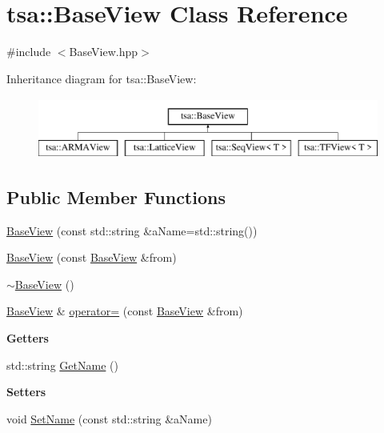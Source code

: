 \hypertarget{classtsa_1_1_base_view}{}\section{tsa\+:\+:Base\+View Class Reference}
\label{classtsa_1_1_base_view}


{\ttfamily \#include $<$Base\+View.\+hpp$>$}

Inheritance diagram for tsa\+:\+:Base\+View\+:\begin{figure}[H]
\begin{center}
\leavevmode
\includegraphics[height=2.000000cm]{classtsa_1_1_base_view}
\end{center}
\end{figure}
\subsection*{Public Member Functions}
\begin{DoxyCompactItemize}
\item 
\hyperlink{classtsa_1_1_base_view_a87ba8f0c139190b95f8b1c5486b342d1}{Base\+View} (const std\+::string \&a\+Name=std\+::string())
\item 
\hyperlink{classtsa_1_1_base_view_a21d825daa5ede62830f69e0ea7275008}{Base\+View} (const \hyperlink{classtsa_1_1_base_view}{Base\+View} \&from)
\item 
\hyperlink{classtsa_1_1_base_view_ad3e2d3032a8efe2bd2dc7a9a9c7636d6}{$\sim$\+Base\+View} ()
\item 
\hyperlink{classtsa_1_1_base_view}{Base\+View} \& \hyperlink{classtsa_1_1_base_view_a29e213aae81ad55e146a5e41ad5a1ce9}{operator=} (const \hyperlink{classtsa_1_1_base_view}{Base\+View} \&from)
\end{DoxyCompactItemize}
\begin{Indent}\textbf{ Getters}\par
\begin{DoxyCompactItemize}
\item 
std\+::string \hyperlink{classtsa_1_1_base_view_ac6e0354eb1ec24205ff893440ff561b9}{Get\+Name} ()
\end{DoxyCompactItemize}
\end{Indent}
\begin{Indent}\textbf{ Setters}\par
\begin{DoxyCompactItemize}
\item 
void \hyperlink{classtsa_1_1_base_view_abcfce2c227a5826093e7cb86a02765f9}{Set\+Name} (const std\+::string \&a\+Name)
\end{DoxyCompactItemize}
\end{Indent}
